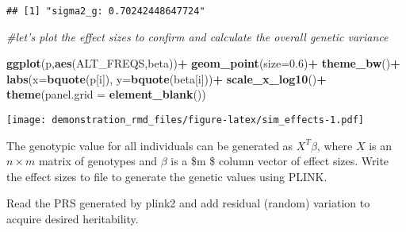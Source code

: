 \documentclass[]{article}
\newenvironment{Shaded}{\begin{snugshade}}{\end{snugshade}}
\newcommand{\CharTok}[1]{\textcolor[rgb]{0.31,0.60,0.02}{#1}}
\newcommand{\CommentTok}[1]{\textcolor[rgb]{0.56,0.35,0.01}{\textit{#1}}}
\newcommand{\DataTypeTok}[1]{\textcolor[rgb]{0.13,0.29,0.53}{#1}}
\newcommand{\FloatTok}[1]{\textcolor[rgb]{0.00,0.00,0.81}{#1}}
\newcommand{\KeywordTok}[1]{\textcolor[rgb]{0.13,0.29,0.53}{\textbf{#1}}}
\newcommand{\NormalTok}[1]{#1}
\newcommand{\OperatorTok}[1]{\textcolor[rgb]{0.81,0.36,0.00}{\textbf{#1}}}
\newcommand{\OtherTok}[1]{\textcolor[rgb]{0.56,0.35,0.01}{#1}}
\newcommand{\StringTok}[1]{\textcolor[rgb]{0.31,0.60,0.02}{#1}}
\begin{document}
\begin{verbatim}
## [1] "sigma2_g: 0.70242448647724"
\end{verbatim}

\begin{Shaded}
\begin{Highlighting}[]
\CommentTok{#let's plot the effect sizes to confirm and calculate the overall genetic variance}

\KeywordTok{ggplot}\NormalTok{(p,}\KeywordTok{aes}\NormalTok{(ALT_FREQS,beta))}\OperatorTok{+}
\StringTok{  }\KeywordTok{geom_point}\NormalTok{(}\DataTypeTok{size=}\FloatTok{0.6}\NormalTok{)}\OperatorTok{+}
\StringTok{  }\KeywordTok{theme_bw}\NormalTok{()}\OperatorTok{+}
\StringTok{  }\KeywordTok{labs}\NormalTok{(}\DataTypeTok{x=}\KeywordTok{bquote}\NormalTok{(p[i]),}
       \DataTypeTok{y=}\KeywordTok{bquote}\NormalTok{(beta[i]))}\OperatorTok{+}
\StringTok{  }\KeywordTok{scale_x_log10}\NormalTok{()}\OperatorTok{+}
\StringTok{  }\KeywordTok{theme}\NormalTok{(}\DataTypeTok{panel.grid =} \KeywordTok{element_blank}\NormalTok{())}
\end{Highlighting}
\end{Shaded}

\texttt{[image: demonstration\_rmd\_files/figure-latex/sim\_effects-1.pdf]}

The genotypic value for all individuals can be generated as
\(X^T \beta\), where \(X\) is an \(n \times m\) matrix of genotypes and
\(\beta\) is a \$m  \$ column vector of effect sizes. Write the
effect sizes to file to generate the genetic values using PLINK.

\begin{Shaded}
\end{Shaded}

Read the PRS generated by plink2 and add residual (random) variation to
acquire desired heritability.
\end{document}
